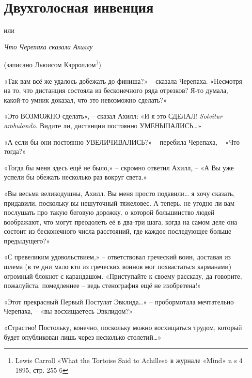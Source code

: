 \documentclass[../main.tex]{subfiles}
\begin{document}
\section{Двухголосная инвенция}

\par\begingroup\centering\Large%
    или

    \emph{Что Черепаха сказала Ахиллу}

    \large%
    (записано Льюисом Кэрроллом\footnote{Lewis Carroll «What the Tortoise Said to Achilles» в журнале «Mind» n s 4 1895, стр. 255 6})
\par\endgroup


\begin{Dialogue}

«Так вам всё же удалось добежать до финиша?» \--- сказала Черепаха. «Несмотря на то, что дистанция состояла из бесконечного ряда отрезков? Я-то думала, какой-то умник доказал, что это невозможно сделать?»

«Это ВОЗМОЖНО сделать», \--- сказал Ахилл: «И я это СДЕЛАЛ! \emph{Solvitur ambulando}. Видите ли, дистанции постоянно УМЕНЬШАЛИСЬ\ldots»

«А если бы они постоянно УВЕЛИЧИВАЛИСЬ?» \--- перебила Черепаха, \--- «Что тогда?»

«Тогда бы меня здесь ещё не было,» \--- скромно ответил Ахилл, \--- «А Вы уже успели бы обежать несколько раз вокруг света.»

«Вы весьма великодушны, Ахилл. Вы меня просто подавили\ldots{} я хочу сказать, придавили, поскольку вы нешуточный тяжеловес. А теперь, не угодно ли вам послушать про такую беговую дорожку, о которой большинство людей воображают, что могут преодолеть её в два-три шага, когда на самом деле она состоит из бесконечного числа расстояний, где каждое последующее больше предыдущего?»

«С превеликим удовольствием,» \--- ответствовал греческий воин, доставая из шлема (в те дни мало кто из греческих воинов мог похвастаться карманами) огромный блокнот с карандашом. «Приступайте к своему рассказу, да говорите, пожалуйста, помедленнее \--- ведь стенография ещё не изобретена!»

«Этот прекрасный Первый Постулат Эвклида\ldots» \--- пробормотала мечтательно Черепаха, \--- «вы восхищаетесь Эвклидом?»

«Страстно! Постольку, конечно, поскольку можно восхищаться трудом, который будет опубликован лишь через несколько столетий\ldots»


\end{Dialogue}
\end{document}
